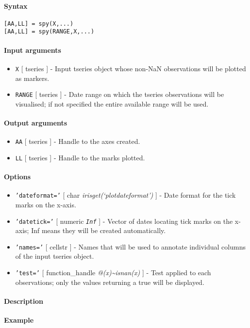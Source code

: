 


	\paragraph{Syntax}

\begin{verbatim}
[AA,LL] = spy(X,...)
[AA,LL] = spy(RANGE,X,...)
\end{verbatim}

\paragraph{Input arguments}

\begin{itemize}
\item
  \texttt{X} {[} tseries {]} - Input tseries object whose non-NaN
  observations will be plotted as markers.
\item
  \texttt{RANGE} {[} tseries {]} - Date range on which the tseries
  observations will be visualised; if not specified the entire available
  range will be used.
\end{itemize}

\paragraph{Output arguments}

\begin{itemize}
\item
  \texttt{AA} {[} tseries {]} - Handle to the axes created.
\item
  \texttt{LL} {[} tseries {]} - Handle to the marks plotted.
\end{itemize}

\paragraph{Options}

\begin{itemize}
\item
  \texttt{'dateformat='} {[} char \textbar{}
  \emph{irisget(`plotdateformat')} {]} - Date format for the tick marks
  on the x-axis.
\item
  \texttt{'datetick='} {[} numeric \textbar{} \emph{\texttt{Inf}} {]} -
  Vector of dates locating tick marks on the x-axis; Inf means they will
  be created automatically.
\item
  \texttt{'names='} {[} cellstr {]} - Names that will be used to
  annotate individual columns of the input tseries object.
\item
  \texttt{'test='} {[} function\_handle \textbar{}
  \emph{@(x)\textasciitilde{}isnan(x)} {]} - Test applied to each
  observations; only the values returning a true will be displayed.
\end{itemize}

\paragraph{Description}

\paragraph{Example}


